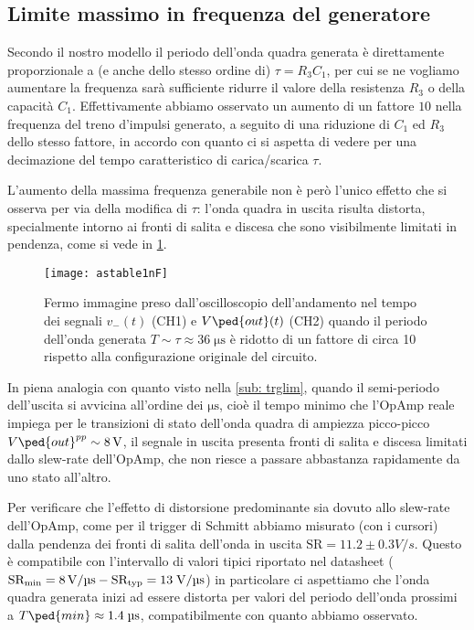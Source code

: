 \documentclass[10pt, a4paper, italian]{article}
\begin{document}
\subsection{Limite massimo in frequenza del generatore}
Secondo il nostro modello il periodo dell'onda quadra generata è direttamente
proporzionale a (e anche dello stesso ordine di) $\tau = R_3 C_1$, per cui
se ne vogliamo aumentare la frequenza sarà sufficiente ridurre il valore
della resistenza $R_3$ o della capacità $C_1$. Effettivamente abbiamo osservato
un aumento di un fattore $10$ nella frequenza del treno d'impulsi generato,
a seguito di una riduzione di $C_1$ ed $R_3$ dello stesso fattore, in accordo
con quanto ci si aspetta di vedere per una decimazione del tempo caratteristico
di carica/scarica $\tau$.

L'aumento della massima frequenza generabile non è però l'unico effetto che
si osserva per via della modifica di $\tau$: l'onda quadra in uscita risulta
distorta, specialmente intorno ai fronti di salita e discesa che sono
visibilmente limitati in pendenza, come si vede in \cref{fig: astable1nF}.
\begin{figure}[htbp]
	\centering
	\texttt{[image: astable1nF]}
	\caption{Fermo immagine preso dall'oscilloscopio dell'andamento nel tempo dei
	segnali $v_- (t)$ (CH1) e $V\ped{out} (t)$ (CH2) quando il periodo dell'onda
	generata $T \sim \tau \approx 36 \; \si{\micro\s}$ è ridotto di un fattore di
	circa 10 rispetto alla configurazione originale del circuito.
	\label{fig: astable1nF}}
\end{figure}

In piena analogia con quanto visto nella \cref{sub: trglim}, quando il
semi-periodo dell'uscita si avvicina all'ordine dei $\si{\micro\s}$, cioè il
tempo minimo che l'OpAmp reale impiega per le transizioni di stato dell'onda
quadra di ampiezza picco-picco $V\ped{out}^{pp} \sim \SI{8}{\V}$, il segnale
in uscita presenta fronti di salita e discesa limitati dallo slew-rate
dell'OpAmp, che non riesce a passare abbastanza rapidamente da uno stato
all'altro.

Per verificare che l'effetto di distorsione predominante sia dovuto allo
slew-rate dell'OpAmp, come per il trigger di Schmitt abbiamo misurato (con
i cursori) dalla pendenza dei fronti di salita dell'onda in uscita
$\mathrm{SR} = 11.2 \pm 0.3 \si{V/s}$. Questo è compatibile con l'intervallo
di valori tipici riportato nel datasheet
($\rm SR_{min} = \SI{8}{\V/\micro\s} - SR_{typ} = 13 \; \si{\V/\micro\s}$)
in particolare ci aspettiamo che l'onda quadra generata inizi ad essere
distorta per valori del periodo dell'onda prossimi a
$T\ped{min} \approx 1.4 \; \si{\micro\s}$, compatibilmente con quanto abbiamo
osservato.
\end{document}
